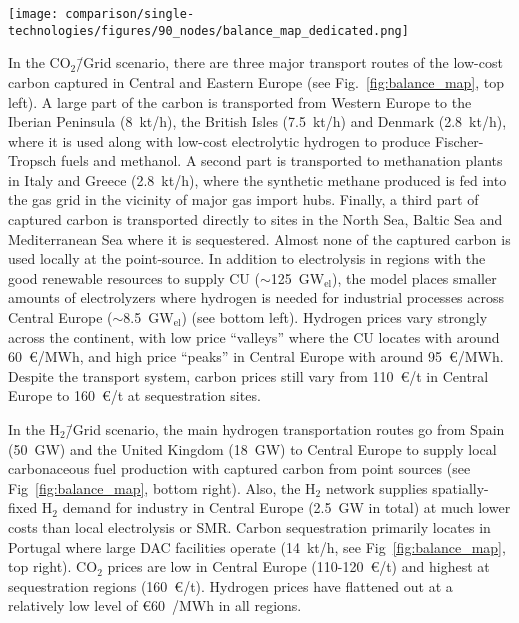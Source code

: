 \documentclass[twocolumn]{article}
\newcommand{\Htwo}{H$_2$}
\newcommand{\carbon}{CO$_2$}
\newcommand{\carbongrid}{CO$_2$\=/Grid}
\newcommand{\carbonscenario}{CO$_2$\=/Grid scenario}
\newcommand{\hydrogenscenario}{H$_2$\=/Grid scenario}
\begin{document}
\begin{figure*}[ht!]
    \centering
    \texttt{[image: comparison/single-technologies/figures/90\_nodes/balance\_map\_dedicated.png]}
    \caption{Average production, consumption, flows and prices of the carbon (top line) and hydrogen (bottom line) sectors in the \carbongrid{} (left) and the \hydrogenscenario{} (right). For each region, upper semicircles show the average production per technology, lower semicircles the consumption, and colors the average marginal prices. Lines and arrows show the interregional transportation. Carbon sequestration offshore are drawn as full circles.
    }
    \label{fig:balance_map}
\end{figure*}


In the \carbonscenario, there are three major transport routes of the low-cost carbon captured in Central and Eastern Europe (see Fig.~\ref{fig:balance_map}, top left). A large part of the carbon is transported from Western Europe to the Iberian Peninsula (8~kt/h), the British Isles (7.5~kt/h) and Denmark (2.8~kt/h), where it is used along with low-cost electrolytic hydrogen to produce Fischer-Tropsch fuels and methanol. A second part is transported to methanation plants in Italy and Greece (2.8~kt/h), where the synthetic methane produced is fed into the gas grid in the vicinity of major gas import hubs. Finally, a third part of captured carbon is transported directly to sites in the North Sea, Baltic Sea and Mediterranean Sea where it is sequestered. Almost none of the captured carbon is used locally at the point-source. In addition to electrolysis in regions with the good renewable resources to supply CU ($\sim$125~GW$_\text{el}$), the model places smaller amounts of electrolyzers where hydrogen is needed for industrial processes across Central Europe ($\sim$8.5~GW$_\text{el}$) (see bottom left). Hydrogen prices vary strongly across the continent, with low price ``valleys'' where the CU locates with around 60~€/MWh, and high price ``peaks'' in Central Europe with around 95~€/MWh. Despite the transport system, carbon prices still vary from 110~€/t in Central Europe to 160~€/t at sequestration sites.

In the \hydrogenscenario{}, the main hydrogen transportation routes go from Spain (50~GW) and the United Kingdom (18~GW) to Central Europe to supply local carbonaceous fuel production with captured carbon from point sources (see Fig~\ref{fig:balance_map}, bottom right). Also, the \Htwo{} network supplies spatially-fixed \Htwo{} demand for industry in Central Europe (2.5~GW in total) at much lower costs than local electrolysis or SMR. Carbon sequestration primarily locates in Portugal where large DAC facilities operate (14~kt/h, see Fig~\ref{fig:balance_map}, top right). \carbon{} prices are low in Central Europe (110-120~€/t) and highest at sequestration regions (160~€/t). Hydrogen prices have flattened out at a relatively low level of €60~/MWh in all regions.
\end{document}
